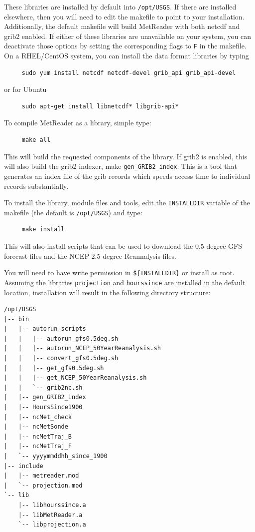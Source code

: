 \documentclass[11pt]{article}   %
\begin{document}
These libraries are installed by default into \texttt{/opt/USGS}.  If there are
installed elsewhere, then you will need to edit the makefile to point to your
installation.
Additionally, the default makefile will build MetReader with both netcdf and grib2
enabled.  If either of these libraries are unavailable on your system, you can
deactivate those options by setting the corresponding flags to \texttt{F} in the makefile.
On a RHEL/CentOS system, you can install the data format libraries by typing
\begin{verbatim}
     sudo yum install netcdf netcdf-devel grib_api grib_api-devel
\end{verbatim}
or for Ubuntu
\begin{verbatim}
     sudo apt-get install libnetcdf* libgrib-api*
\end{verbatim}
To compile MetReader as a library, simple type:
\begin{verbatim}
     make all
\end{verbatim}
This will build the requested components of the library.  If grib2 is enabled,
this will also build the grib2 indexer, make \texttt{gen\_GRIB2\_index}.
This is a tool that generates an index file of the grib records which speeds
access time to individual records substantially.

To install the library, module files and tools, edit the \texttt{INSTALLDIR} variable of
the makefile (the default is \texttt{/opt/USGS}) and type:
\begin{verbatim}
     make install
\end{verbatim}
This will also install scripts that can be used to download the 0.5 degree GFS
forecast files and the NCEP 2.5-degree Reannalysis files.

You will need to have write permission in \texttt{\$\{INSTALLDIR\}}
or install as root.  Assuming the libraries \texttt{projection} and \texttt{hourssince} are
installed in the default location, installation will result in the following
directory structure:
\begin{verbatim}
/opt/USGS
|-- bin
|   |-- autorun_scripts
|   |   |-- autorun_gfs0.5deg.sh
|   |   |-- autorun_NCEP_50YearReanalysis.sh
|   |   |-- convert_gfs0.5deg.sh
|   |   |-- get_gfs0.5deg.sh
|   |   |-- get_NCEP_50YearReanalysis.sh
|   |   `-- grib2nc.sh
|   |-- gen_GRIB2_index
|   |-- HoursSince1900
|   |-- ncMet_check
|   |-- ncMetSonde
|   |-- ncMetTraj_B
|   |-- ncMetTraj_F
|   `-- yyyymmddhh_since_1900
|-- include
|   |-- metreader.mod
|   `-- projection.mod
`-- lib
    |-- libhourssince.a
    |-- libMetReader.a
    `-- libprojection.a
\end{verbatim}
\end{document}
